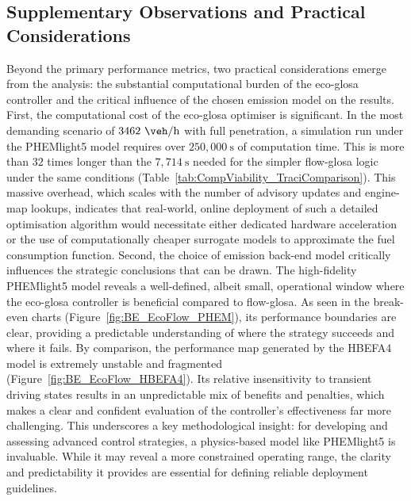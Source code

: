 \subsection*{Supplementary Observations and Practical Considerations}
Beyond the primary performance metrics, two practical considerations emerge from the analysis: the substantial computational burden of the \ac{eco-glosa} controller and the critical influence of the chosen emission model on the results.
\mynewline
First, the computational cost of the \ac{eco-glosa} optimiser is significant. In the most demanding scenario of $3462~\unit{\veh\per\hour}$ with full penetration, a simulation run under the PHEMlight5 model requires over $250,000~\unit{\second}$ of computation time. This is more than $32$ times longer than the $7,714~\unit{\second}$ needed for the simpler \ac{flow-glosa} logic under the same conditions (Table~\vref{tab:CompViability_TraciComparison}). This massive overhead, which scales with the number of advisory updates and engine-map lookups, indicates that real-world, online deployment of such a detailed optimisation algorithm would necessitate either dedicated hardware acceleration or the use of computationally cheaper surrogate models to approximate the fuel consumption function.
\mynewline
Second, the choice of emission back-end model critically influences the strategic conclusions that can be drawn. The high-fidelity PHEMlight5 model reveals a well-defined, albeit small, operational window where the \ac{eco-glosa} controller is beneficial compared to \ac{flow-glosa}. As seen in the break-even charts (Figure~\vref{fig:BE_EcoFlow_PHEM}), its performance boundaries are clear, providing a predictable understanding of where the strategy succeeds and where it fails. By comparison, the performance map generated by the HBEFA4 model is extremely unstable and fragmented (Figure~\vref{fig:BE_EcoFlow_HBEFA4}). Its relative insensitivity to transient driving states results in an unpredictable mix of benefits and penalties, which makes a clear and confident evaluation of the controller's effectiveness far more challenging. This underscores a key methodological insight: for developing and assessing advanced control strategies, a physics-based model like PHEMlight5 is invaluable. While it may reveal a more constrained operating range, the clarity and predictability it provides are essential for defining reliable deployment guidelines.

